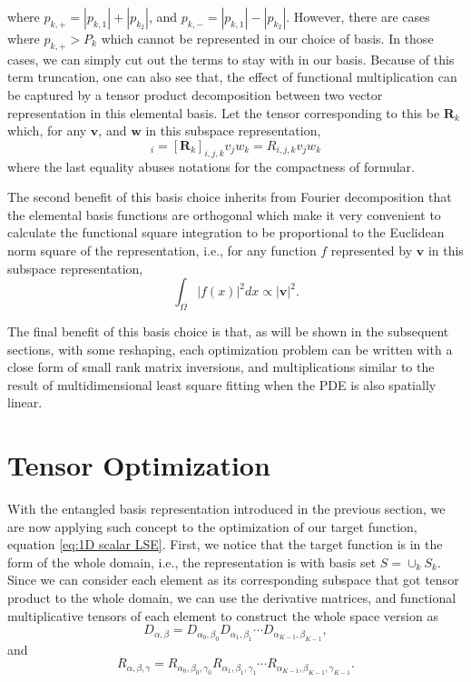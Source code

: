 \documentclass[preprint, 12pt]{revtex4-2}
\numberwithin{equation}{section}
\begin{document}
where $p_{k,+}=|p_{k, 1}|+|p_{k_2}|$, and $p_{k,-}=|p_{k, 1}|-|p_{k_2}|$. However, there are cases where $p_{k,+}>P_k$ which cannot be represented in our choice of basis. In those cases, we can simply cut out the terms to stay with in our basis. Because of this term truncation, one can also see that, the effect of functional multiplication can be captured by a tensor product decomposition between two vector representation in this elemental basis. Let the tensor corresponding to this be $\mathbf{R}_k$ which, for any $\mathbf{v}$, and $\mathbf{w}$ in this subspace representation,
\begin{equation}
    [\mathbf{v}\mathbf{w}]_i = [\mathbf{R}_{k}]_{i,j,k}v_jw_k=R_{i,j,k}v_jw_k
\end{equation}
where the last equality abuses notations for the compactness of formular.

The second benefit of this basis choice inherits from Fourier decomposition that the elemental basis functions are orthogonal which make it very convenient to calculate the functional square integration to be proportional to the Euclidean norm square of the representation, i.e., for any function $f$ represented by $\mathbf{v}$ in this subspace representation,
\begin{equation}
    \int_\Omega|f(x)|^2 dx \propto |\mathbf{v}|^2.
\end{equation}

The final benefit of this basis choice is that, as will be shown in the subsequent sections, with some reshaping, each optimization problem can be written with a close form of small rank matrix inversions, and multiplications similar to the result of multidimensional least square fitting when the PDE is also spatially linear.

\section{Tensor Optimization}
With the entangled basis representation introduced in the previous section, we are now applying such concept to the optimization of our target function, equation \ref{eq:1D scalar LSE}. First, we notice that the target function is in the form of the whole domain, i.e., the representation is with basis set $S=\cup_k S_k$. Since we can consider each element as its corresponding subspace that got tensor product to the whole domain, we can use the derivative matrices, and functional multiplicative tensors of each element to construct the whole space version as
\begin{equation}
    D_{\alpha,\beta} = D_{\alpha_0,\beta_0}D_{\alpha_1,\beta_1}\cdots D_{\alpha_{K-1},\beta_{K-1}},
\end{equation}
and
\begin{equation}
    R_{\alpha,\beta,\gamma} = R_{\alpha_0,\beta_0,\gamma_0}R_{\alpha_1,\beta_1,\gamma_1}\cdots R_{\alpha_{K-1},\beta_{K-1},\gamma_{K-1}}.
\end{equation}
\end{document}
